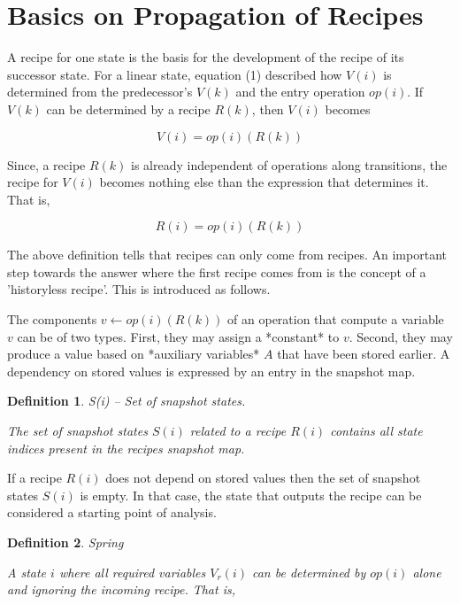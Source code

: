 \documentclass[12pt,a4paper]{scrartcl}
\newtheorem{definition}{Definition}
\begin{document}
\section{Basics on Propagation of Recipes}

A recipe for one state is the basis for the development of the recipe of its
successor state. For a linear state, equation (1) described how $V(i)$ is
determined from the predecessor's $V(k)$ and the entry operation $op(i)$. If
$V(k)$ can be determined by a recipe $R(k)$, then $V(i)$ becomes

\begin{equation} \label{eq:accumulation2}
                     V(i) = op(i)(R(k))                                     
\end{equation}

Since, a recipe $R(k)$ is already independent of operations along transitions,
the recipe for $V(i)$ becomes nothing else than the expression that
determines it. That is,

\begin{equation} \label{eq:accumulation3}
                     R(i) = { op(i)(R(k)) }                                 
\end{equation}
                 
The above definition tells that recipes can only come from recipes. An
important step towards the answer where the first recipe comes from is the
concept of a 'historyless recipe'. This is introduced as follows. 

The components $v \leftarrow op(i)(R(k))$ of an operation that compute a variable $v$
can be of two types. First, they may assign a *constant* to $v$. Second, they may
produce a value based on *auxiliary variables* $A$ that have been stored earlier.
A dependency on stored values is expressed by an entry in the snapshot map.

\begin{definition}
S(i) -- Set of snapshot states.

The set of snapshot states $S(i)$ related to a recipe $R(i)$ contains
all state indices present in the recipes snapshot map.
\end{definition}

If a recipe $R(i)$ does not depend on stored values then the set of snapshot
states $S(i)$ is empty. In that case, the state that outputs the recipe can 
be considered a starting point of analysis.

\begin{definition}
Spring

A state $i$ where all required variables $V_r(i)$ can be determined by 
$op(i)$ alone and ignoring the incoming recipe. That is, 
\end{definition}
\end{document}
